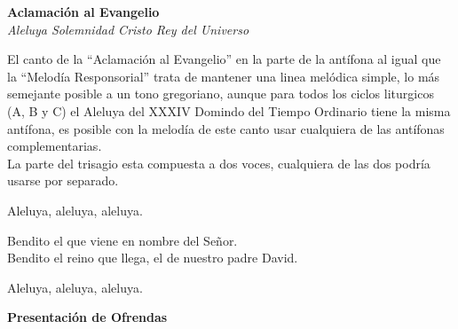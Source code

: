 \documentclass[12pt, letterpaper]{report}
\begin{document}

    \begin{center}
      \LARGE \textbf{Aclamaci\'on al Evangelio}\\
      \Large \textit{Aleluya Solemnidad Cristo Rey del Universo}
    \end{center}

    \Large El canto de la ``Aclamaci\'on al Evangelio'' en la parte de la ant\'ifona al igual que la ``Melod\'ia Responsorial'' trata de mantener una linea mel\'odica simple, lo m\'as semejante posible a un tono gregoriano, aunque para todos los ciclos liturgicos (A, B y C) el Aleluya del XXXIV Domindo del Tiempo Ordinario tiene la misma ant\'ifona, es posible con la melod\'ia de este canto usar cualquiera de las ant\'ifonas complementarias.\\
    La parte del trisagio esta compuesta a dos voces, cualquiera de las dos podr\'ia usarse por separado.

    \noindent
    \LARGE Aleluya, aleluya, aleluya.

    \noindent
    Bendito el que viene en nombre del Se\~nor.\\
    Bendito el reino que llega, el de nuestro padre David.

    \noindent
    Aleluya, aleluya, aleluya.
    \clearpage




    \begin{center}
      \LARGE \textbf{Presentaci\'on de Ofrendas}
    \end{center}
\end{document}

